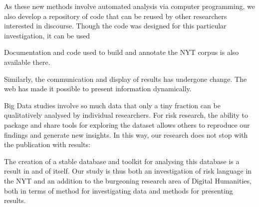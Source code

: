 As these new methods involve automated analysis via computer programming, we also develop a repository of code that can be reused by other researchers interested in discourse. Though the code was designed for this particular investigation, it can be used 

Documentation and code used to build and annotate the NYT corpus is also available there.

Similarly, the communication and display of results has undergone change. The web has made it possible to present information dynamically.

Big Data studies involve so much data that only a tiny fraction can be qualitatively analysed by individual researchers. For risk research, the ability to package and share tools for exploring the dataset allows others to reproduce our findings and generate new insights. In this way, our research does not stop with the publication with results: 

The creation of a stable database and toolkit for analysing this database is a result in and of itself. Our study is thus both an investigation of risk language in the NYT and an addition to the burgeoning research area of Digital Humanities, both in terms of method for investigating data and methods for presenting results.


%